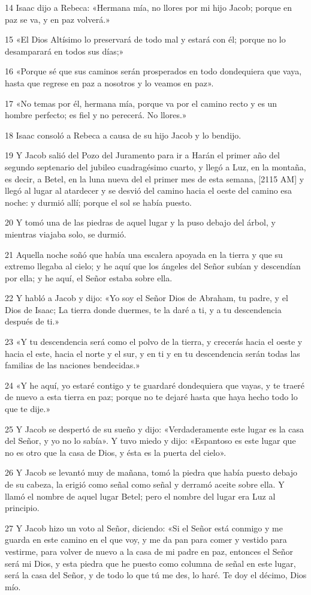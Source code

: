 \par 14 Isaac dijo a Rebeca: «Hermana mía, no llores por mi hijo Jacob; porque en paz se va, y en paz volverá.»
\par 15 «El Dios Altísimo lo preservará de todo mal y estará con él; porque no lo desamparará en todos sus días;»
\par 16 «Porque sé que sus caminos serán prosperados en todo dondequiera que vaya, hasta que regrese en paz a nosotros y lo veamos en paz».
\par 17 «No temas por él, hermana mía, porque va por el camino recto y es un hombre perfecto; es fiel y no perecerá. No llores.»
\par 18 Isaac consoló a Rebeca a causa de su hijo Jacob y lo bendijo.
\par 19 Y Jacob salió del Pozo del Juramento para ir a Harán el primer año del segundo septenario del jubileo cuadragésimo cuarto, y llegó a Luz, en la montaña, es decir, a Betel, en la luna nueva del el primer mes de esta semana, [2115 AM] y llegó al lugar al atardecer y se desvió del camino hacia el oeste del camino esa noche: y durmió allí; porque el sol se había puesto.
\par 20 Y tomó una de las piedras de aquel lugar y la puso debajo del árbol, y mientras viajaba solo, se durmió.
\par 21 Aquella noche soñó que había una escalera apoyada en la tierra y que su extremo llegaba al cielo; y he aquí que los ángeles del Señor subían y descendían por ella; y he aquí, el Señor estaba sobre ella.
\par 22 Y habló a Jacob y dijo: «Yo soy el Señor Dios de Abraham, tu padre, y el Dios de Isaac; La tierra donde duermes, te la daré a ti, y a tu descendencia después de ti.»
\par 23 «Y tu descendencia será como el polvo de la tierra, y crecerás hacia el oeste y hacia el este, hacia el norte y el sur, y en ti y en tu descendencia serán todas las familias de las naciones bendecidas.»
\par 24 «Y he aquí, yo estaré contigo y te guardaré dondequiera que vayas, y te traeré de nuevo a esta tierra en paz; porque no te dejaré hasta que haya hecho todo lo que te dije.»
\par 25 Y Jacob se despertó de su sueño y dijo: «Verdaderamente este lugar es la casa del Señor, y yo no lo sabía». Y tuvo miedo y dijo: «Espantoso es este lugar que no es otro que la casa de Dios, y ésta es la puerta del cielo».
\par 26 Y Jacob se levantó muy de mañana, tomó la piedra que había puesto debajo de su cabeza, la erigió como señal como señal y derramó aceite sobre ella. Y llamó el nombre de aquel lugar Betel; pero el nombre del lugar era Luz al principio.
\par 27 Y Jacob hizo un voto al Señor, diciendo: «Si el Señor está conmigo y me guarda en este camino en el que voy, y me da pan para comer y vestido para vestirme, para volver de nuevo a la casa de mi padre en paz, entonces el Señor será mi Dios, y esta piedra que he puesto como columna de señal en este lugar, será la casa del Señor, y de todo lo que tú me des, lo haré. Te doy el décimo, Dios mío.

